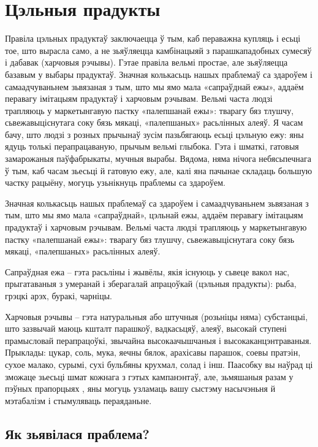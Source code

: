 \chapter{Цэльныя прадукты}

Правіла цэльных прадуктаў заключаецца ў тым, каб пераважна купляць і есьці тое, што вырасла само, а не зьяўляецца камбінацыяй з парашкападобных сумесяў і дабавак (харчовыя рэчывы). Гэтае правіла вельмі простае, але зьяўляецца базавым у выбары прадуктаў. Значная колькасьць нашых праблемаў са здароўем і самаадчуваньнем зьвязаная з тым, што мы ямо мала «сапраўднай ежы», аддаём перавагу імітацыям прадуктаў і харчовым рэчывам. Вельмі часта людзі трапляюць у маркетынгавую пастку «палепшанай ежы»: тварагу бяз тлушчу, сьвежавыціснутага соку бязь мякаці, «палепшаных» расьлінных алеяў. Я часам бачу, што людзі з розных прычынаў зусім пазьбягаюць есьці цэльную ежу: яны ядуць толькі перапрацаваную, прычым вельмі глыбока. Гэта і шматкі, гатовыя замарожаныя паўфабрыкаты, мучныя вырабы. Вядома, няма нічога небясьпечнага ў тым, каб часам зьесьці й гатовую ежу, але, калі яна пачынае складаць большую частку рацыёну, могуць узьнікнуць праблемы са здароўем.

Значная колькасьць нашых праблемаў са здароўем і самаадчуваньнем зьвязаная з тым, што мы ямо мала «сапраўднай», цэльнай ежы, аддаём перавагу імітацыям прадуктаў і харчовым рэчывам. Вельмі часта людзі трапляюць у маркетынгавую пастку «палепшанай ежы»: тварагу бяз тлушчу, сьвежавыціснутага соку бязь мякаці, «палепшаных» расьлінных алеяў.

Сапраўдная ежа – гэта расьліны і жывёлы, якія існуюць у сьвеце вакол нас, прыгатаваныя з умеранай і зберагалай апрацоўкай (цэльныя прадукты): рыба, грэцкі арэх, буракі, чарніцы.

Харчовыя рэчывы – гэта натуральныя або штучныя (розьніцы няма) субстанцыі, што зазвычай маюць кшталт парашкоў, вадкасьцяў, алеяў, высокай ступені прамысловай перапрацоўкі, звычайна высокаачышчаныя і высокаканцэнтраваныя. Прыклады: цукар, соль, мука, яечны бялок, арахісавы парашок, соевы пратэін, сухое малако, сурымі, сухі бульбяны крухмал, солад і інш. Паасобку вы наўрад ці зможаце зьесьці шмат кожнага з гэтых кампанэнтаў, але, зьмяшаныя разам у пэўных прапорцыях , яны могуць узламаць вашу сыстэму насычэньня й мэтабалізм і стымуляваць пераяданьне.

\section{Як зьявілася праблема?}

